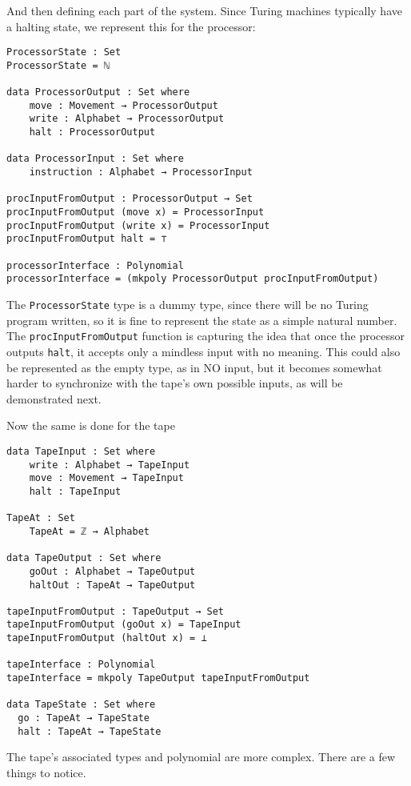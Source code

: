 And then defining each part of the system. Since Turing machines typically have a halting state, we represent this for the processor:
\begin{verbatim}
ProcessorState : Set
ProcessorState = ℕ 

data ProcessorOutput : Set where
    move : Movement → ProcessorOutput
    write : Alphabet → ProcessorOutput
    halt : ProcessorOutput

data ProcessorInput : Set where
    instruction : Alphabet → ProcessorInput

procInputFromOutput : ProcessorOutput → Set
procInputFromOutput (move x) = ProcessorInput
procInputFromOutput (write x) = ProcessorInput
procInputFromOutput halt = ⊤

processorInterface : Polynomial
processorInterface = (mkpoly ProcessorOutput procInputFromOutput)
\end{verbatim}

The \texttt{ProcessorState} type is a dummy type, since there will be no Turing program written, so it is fine to represent the state as a simple natural number. The \texttt{procInputFromOutput} function is capturing the idea that once the processor outputs \texttt{halt}, it accepts only a mindless input with no meaning. This could also be represented as the empty type, as in NO input, but it becomes somewhat harder to synchronize with the tape's own possible inputs, as will be demonstrated next.

Now the same is done for the tape

\begin{verbatim}
data TapeInput : Set where
    write : Alphabet → TapeInput
    move : Movement → TapeInput
    halt : TapeInput
    
TapeAt : Set
    TapeAt = ℤ → Alphabet
  
data TapeOutput : Set where
    goOut : Alphabet → TapeOutput
    haltOut : TapeAt → TapeOutput
  
tapeInputFromOutput : TapeOutput → Set
tapeInputFromOutput (goOut x) = TapeInput
tapeInputFromOutput (haltOut x) = ⊥
  
tapeInterface : Polynomial
tapeInterface = mkpoly TapeOutput tapeInputFromOutput

data TapeState : Set where
  go : TapeAt → TapeState
  halt : TapeAt → TapeState
\end{verbatim}

The tape's associated types and polynomial are more complex. There are a few things to notice.

